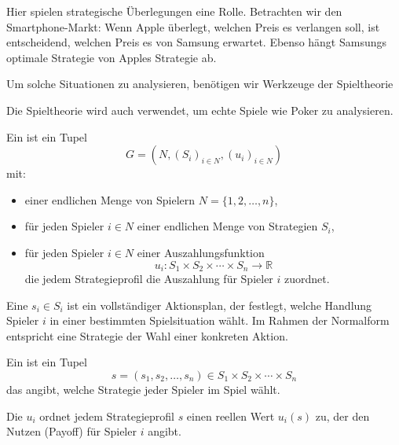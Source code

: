 \noindent Hier spielen strategische Überlegungen eine Rolle. 
Betrachten wir den Smartphone-Markt: 
Wenn Apple überlegt, welchen Preis es verlangen soll, ist entscheidend, welchen Preis es von Samsung erwartet. 
Ebenso hängt Samsungs optimale Strategie von Apples Strategie ab.

\noindent Um solche Situationen zu analysieren, benötigen wir Werkzeuge der Spieltheorie

\begin{remark}
Die Spieltheorie wird auch verwendet, um echte Spiele wie Poker zu analysieren.
\end{remark}


\begin{definition}
Ein  ist ein Tupel
\[
G = \left( N, (S_i)_{i \in N}, (u_i)_{i \in N} \right)
\]
mit:
\begin{itemize}
    \item einer endlichen Menge von Spielern $N = \{1, 2, \dots, n\}$,
    \item für jeden Spieler $i \in N$ einer endlichen Menge von Strategien $S_i$,
    \item für jeden Spieler $i \in N$ einer Auszahlungsfunktion
    \[
    u_i: S_1 \times S_2 \times \cdots \times S_n \rightarrow \mathbb{R}
    \]
    die jedem Strategieprofil die Auszahlung für Spieler $i$ zuordnet.
\end{itemize}
\end{definition}

\begin{definition}[Strategie]
Eine  $s_i \in S_i$ ist ein vollständiger Aktionsplan, der festlegt, welche Handlung Spieler $i$ in einer bestimmten Spielsituation wählt. Im Rahmen der Normalform entspricht eine Strategie der Wahl einer konkreten Aktion.
\end{definition}

\begin{definition}[Strategieprofil]
Ein  ist ein Tupel
\[
s = (s_1, s_2, \dots, s_n) \in S_1 \times S_2 \times \cdots \times S_n
\]
das angibt, welche Strategie jeder Spieler im Spiel wählt.
\end{definition}

\begin{definition}[Auszahlungsfunktion]
Die  $u_i$ ordnet jedem Strategieprofil $s$ einen reellen Wert $u_i(s)$ zu, der den Nutzen (Payoff) für Spieler $i$ angibt.
\end{definition}


